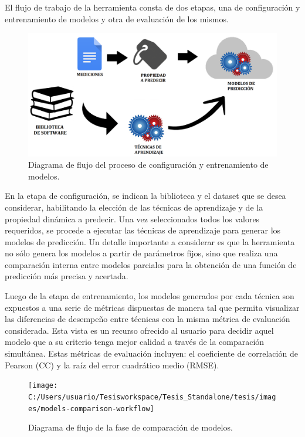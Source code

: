 El flujo de trabajo de la herramienta consta de dos etapas, una de
configuración y entrenamiento de modelos y otra de evaluación de los
mismos. 

\begin{figure}
\begin{centering}
\includegraphics[scale=0.2]{images/prediction-workflow}
\par\end{centering}

\caption{Diagrama de flujo del proceso de configuración y entrenamiento de
modelos.\label{fig:prediction-workflow-1}}
\end{figure}


En la etapa de configuración, se indican la biblioteca y el dataset
que se desea considerar, habilitando la elección de las técnicas de
aprendizaje y de la propiedad dinámica a predecir. Una vez seleccionados
todos los valores requeridos, se procede a ejecutar las técnicas de
aprendizaje para generar los modelos de predicción. Un detalle importante
a considerar es que la herramienta no sólo genera los modelos a partir
de parámetros fijos, sino que realiza una comparación interna entre
modelos parciales para la obtención de una función de predicción más
precisa y acertada.

Luego de la etapa de entrenamiento, los modelos generados por cada
técnica son expuestos a una serie de métricas dispuestas de manera
tal que permita visualizar las diferencias de desempeño entre técnicas
con la misma métrica de evaluación considerada. Esta vista es un recurso
ofrecido al usuario para decidir aquel modelo que a su criterio tenga
mejor calidad a través de la comparación simultánea. Estas métricas
de evaluación incluyen: el coeficiente de correlación de Pearson (CC)
y la raíz del error cuadrático medio (RMSE).

\begin{figure}
\begin{centering}
\texttt{[image: C:/Users/usuario/Tesisworkspace/Tesis\_Standalone/tesis/images/models-comparison-workflow]}
\par\end{centering}

\caption{Diagrama de flujo de la fase de comparación de modelos. \label{fig:models-comparison-workflow}}
\end{figure}


